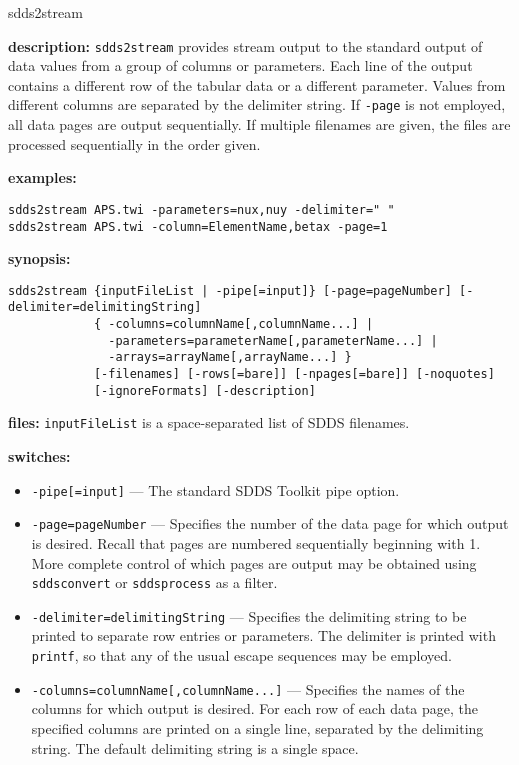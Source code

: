 \begin{sddsprog}{sdds2stream}
  \item \textbf{description:}
    {\tt sdds2stream} provides stream output to the standard output of data values from a group of columns or parameters.
    Each line of the output contains a different row of the tabular data or a different parameter.
    Values from different columns are separated by the delimiter string.
    If \verb|-page| is not employed, all data pages are output sequentially.
    If multiple filenames are given, the files are processed sequentially in the order given.
  \item \textbf{examples:}
    \begin{verbatim}
sdds2stream APS.twi -parameters=nux,nuy -delimiter=" "
sdds2stream APS.twi -column=ElementName,betax -page=1
    \end{verbatim}
  \item \textbf{synopsis:}
    \begin{verbatim}
sdds2stream {inputFileList | -pipe[=input]} [-page=pageNumber] [-delimiter=delimitingString]
            { -columns=columnName[,columnName...] |
              -parameters=parameterName[,parameterName...] |
              -arrays=arrayName[,arrayName...] }
            [-filenames] [-rows[=bare]] [-npages[=bare]] [-noquotes]
            [-ignoreFormats] [-description]
    \end{verbatim}
  \item \textbf{files:}
    {\tt inputFileList} is a space-separated list of SDDS filenames.
  \item \textbf{switches:}
    \begin{itemize}
      \item {\tt -pipe[=input]} --- The standard SDDS Toolkit pipe option.
      \item {\tt -page=pageNumber} --- Specifies the number of the data page for which output is desired. Recall that pages are numbered sequentially beginning with 1. More complete control of which pages are output may be obtained using {\tt sddsconvert} or {\tt sddsprocess} as a filter.
      \item {\tt -delimiter=delimitingString} --- Specifies the delimiting string to be printed to separate row entries or parameters. The delimiter is printed with \verb|printf|, so that any of the usual escape sequences may be employed.
      \item {\tt -columns=columnName[,columnName...]} --- Specifies the names of the columns for which output is desired. For each row of each data page, the specified columns are printed on a single line, separated by the delimiting string. The default delimiting string is a single space.

\end{itemize}
\end{sddsprog}
